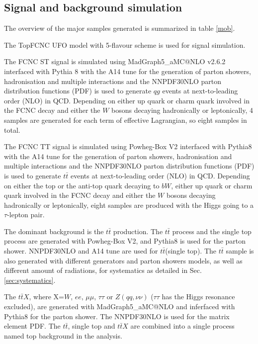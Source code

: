 \subsection{Signal and background simulation}
\label{sec:generator}

The overview of the major samples generated is summarized in table \ref{mob}.

The TopFCNC UFO model \cite{FCNC_UFO1,FCNC_UFO2} with 5-flavour scheme is used for signal simulation.

The FCNC ST signal is simulated using MadGraph5\_aMC@NLO v2.6.2 \cite{MG5} interfaced with Pythia 8 \cite{Pythia8} with the A14 tune \cite{A14} for the generation of parton showers, hadronisation and multiple interactions and the NNPDF30NLO \cite{NNPDF30NLO} parton distribution functions (PDF) is used to generate $qg$ events at next-to-leading order (NLO) in QCD. Depending on either up quark or charm quark involved in the FCNC decay and either the $W$ bosons decaying hadronically or leptonically, 4 samples are generated for each term of effective Lagrangian, so eight samples in total.

The FCNC TT signal is simulated using Powheg-Box \cite{Powheg} V2 interfaced with Pythia8 \cite{Pythia8} with the A14 tune \cite{A14} for the generation of parton showers, hadronisation and multiple interactions and the NNPDF30NLO \cite{NNPDF30NLO} parton distribution functions (PDF) is used to generate $t\bar{t}$ events at next-to-leading order (NLO) in QCD. Depending on either the top or the anti-top quark decaying to $bW$, either up quark or charm quark involved in the FCNC decay and either the $W$ bosons decaying hadronically or leptonically, eight samples are produced with the Higgs going to a $\tau$-lepton pair.

The dominant background is the $t\bar{t}$ production. The $t\bar{t}$ process and the single top process are generated with Powheg-Box \cite{Powheg} V2, and Pythia8 is used for the parton shower. NNPDF30NLO \cite{NNPDF30NLO} and A14 tune \cite{A14} are used for $t\bar{t}$(single top). The $t\bar{t}$ sample is also generated with different generators and parton showers models, as well as different amount of radiations, for systematics as detailed in Sec. \ref{sec:systematics}.

The $t\bar{t}X$, where X=$W$, $ee$, $\mu\mu$, $\tau\tau$ or $Z(qq,\nu\nu)$ ($\tau\tau$ has the Higgs resonance excluded), are generated with MadGraph5\_aMC@NLO and inferfaced with Pythia8 for the parton shower. The NNPDF30NLO \cite{NNPDF30NLO} is used for the matrix element PDF. The $t\bar{t}$, single top and $t\bar{t}X$ are combined into a single process named top background in the analysis.

